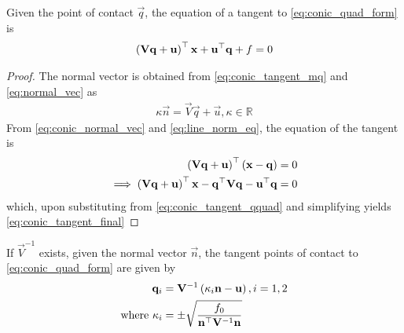 
\begin{theorem}[Tangent]
  Given the point of contact $\vec{q}$, the equation of a tangent to \eqref{eq:conic_quad_form} is 
  \begin{align}
  \left(\mathbf{V}\mathbf{q}+\mathbf{u}\right)^{\top}\mathbf{x}+\mathbf{u}^{\top}\mathbf{q}+f = 0
  \label{eq:conic_tangent_final}
  \end{align}
\end{theorem}
\begin{proof}
  The normal vector is obtained from \eqref{eq:conic_tangent_mq} and \eqref{eq:normal_vec}
  as
  \begin{align}
  \label{eq:conic_normal_vec}
	  \kappa \vec{n} = \vec{V}\vec{q}+\vec{u}, \kappa \in \mathbb{R}
  \end{align}  
  From \eqref{eq:conic_normal_vec} and \eqref{eq:line_norm_eq}, the equation of the tangent is\begin{align}
    \left(\mathbf{V}\mathbf{q}+\mathbf{u}\right)^{\top}\left(\mathbf{x}-\mathbf{q}\right) &=0
    \\
    \implies \left(\mathbf{V}\mathbf{q}+\mathbf{u}\right)^{\top}\mathbf{x}-\mathbf{q}^{\top}\mathbf{V}\mathbf{q}-\mathbf{u}^{\top}\mathbf{q} &= 0
    \end{align}
    which, upon substituting from \eqref{eq:conic_tangent_qquad} and simplifying yields 
  \eqref{eq:conic_tangent_final}
\end{proof}
\begin{theorem}
	\label{eq:conic-p-contact-nonparab}
  If $\vec{V}^{-1}$ exists, given the normal vector $\vec{n}$, the tangent points of contact to \eqref{eq:conic_quad_form} are given by
\begin{align}
  \begin{split}
\mathbf{q}_i &= \mathbf{V}^{-1}\left(\kappa_i \mathbf{n}-\mathbf{u}\right), i = 1,2
\\
\text{where }\kappa_i &= \pm \sqrt{
\frac{
f_0
}
{
\mathbf{n}^{\top}\mathbf{V}^{-1}\mathbf{n}
}
}
  \end{split}
\label{eq:conic_tangent_qk}
\end{align}
\end{theorem}
